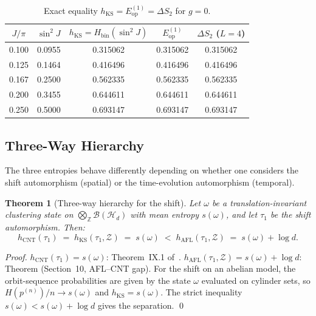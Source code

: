 \documentclass[12pt,a4paper]{article}
\newtheorem{theorem}{Theorem}[section]
\begin{document}
\begin{table}[h!]
\centering
\caption{Exact equality $h_{\mathrm{KS}}=E_{\mathrm{op}}^{(1)}=\Delta S_2$ for $g=0$.}
\label{tab:markov_equality}
\begin{tabular}{c|c|c|c|c}
$J/\pi$ & $\sin^2 J$ & $h_{\mathrm{KS}}=H_{\mathrm{bin}}(\sin^2J)$ & $E_{\mathrm{op}}^{(1)}$ & $\Delta S_2$ ($L=4$)\\
\hline
0.100 & 0.0955 & 0.315062 & 0.315062 & 0.315062\\
0.125 & 0.1464 & 0.416496 & 0.416496 & 0.416496\\
0.167 & 0.2500 & 0.562335 & 0.562335 & 0.562335\\
0.200 & 0.3455 & 0.644611 & 0.644611 & 0.644611\\
0.250 & 0.5000 & 0.693147 & 0.693147 & 0.693147\\
\end{tabular}
\end{table}

\subsection{Three-Way Hierarchy}
\label{sec:three_way}

The three entropies behave differently depending on whether one considers the
shift automorphism (spatial) or the time-evolution automorphism (temporal).

\begin{theorem}[Three-way hierarchy for the shift]
\label{thm:shift_hierarchy}
Let $\omega$ be a translation-invariant clustering state on $\bigotimes_\mathbb{Z}\mathcal{B}(\mathcal{H}_d)$
with mean entropy $s(\omega)$, and let $\tau_1$ be the shift automorphism.  Then:
\[
  h_{\mathrm{CNT}}(\tau_1)
  \;=\; h_{\mathrm{KS}}(\tau_1,\mathcal{Z})
  \;=\; s(\omega)
  \;<\; h_{\mathrm{AFL}}(\tau_1,\mathcal{Z})
  \;=\; s(\omega)+\log d.
\]
\end{theorem}

\begin{proof}
$h_{\mathrm{CNT}}(\tau_1)=s(\omega)$: Theorem~IX.1 of~\cite{cnt87}.
$h_{\mathrm{AFL}}(\tau_1,\mathcal{Z})=s(\omega)+\log d$: Theorem (Section~10,
AFL--CNT gap).  For the shift on an abelian model, the orbit-sequence
probabilities are given by the state $\omega$ evaluated on cylinder sets,
so $H(p^{(n)})/n\to s(\omega)$ and $h_{\mathrm{KS}}=s(\omega)$.
The strict inequality $s(\omega)<s(\omega)+\log d$ gives the separation.  \qed
\end{proof}
\end{document}
